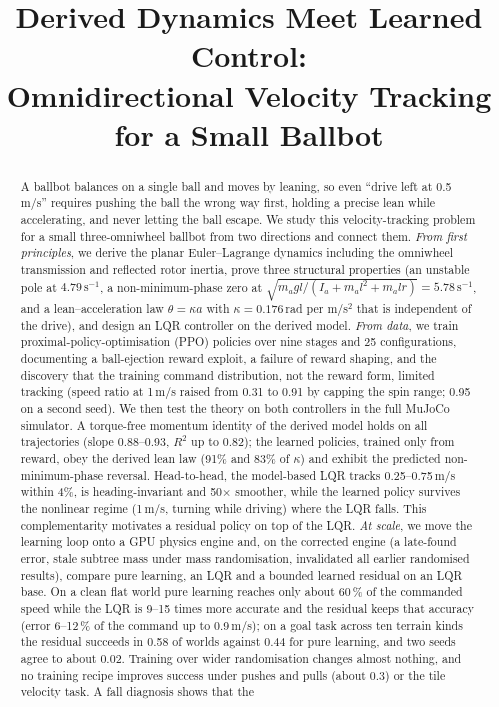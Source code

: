 \documentclass[conference]{IEEEtran}
\theoremstyle{remark}
\begin{document}
\title{Derived Dynamics Meet Learned Control:\\
Omnidirectional Velocity Tracking for a Small Ballbot}

\author{
}
\maketitle

\begin{abstract}
A ballbot balances on a single ball and moves by leaning, so even ``drive left at 0.5\,m/s'' requires pushing the ball the wrong way first, holding a precise lean while accelerating, and never letting the ball escape. We study this velocity-tracking problem for a small three-omniwheel ballbot from two directions and connect them. \emph{From first principles}, we derive the planar Euler--Lagrange dynamics including the omniwheel transmission and reflected rotor inertia, prove three structural properties (an unstable pole at $4.79\,\mathrm{s}^{-1}$, a non-minimum-phase zero at $\sqrt{m_a g l/(I_a+m_a l^2+m_a l r)}=5.78\,\mathrm{s}^{-1}$, and a lean--acceleration law $\theta=\kappa a$ with $\kappa=0.176$\,rad per m/s$^2$ that is independent of the drive), and design an LQR controller on the derived model. \emph{From data}, we train proximal-policy-optimisation (PPO) policies over nine stages and 25 configurations, documenting a ball-ejection reward exploit, a failure of reward shaping, and the discovery that the training command distribution, not the reward form, limited tracking (speed ratio at 1\,m/s raised from 0.31 to 0.91 by capping the spin range; 0.95 on a second seed). We then test the theory on both controllers in the full MuJoCo simulator. A torque-free momentum identity of the derived model holds on all trajectories (slope 0.88--0.93, $R^2$ up to 0.82); the learned policies, trained only from reward, obey the derived lean law (91\% and 83\% of $\kappa$) and exhibit the predicted non-minimum-phase reversal. Head-to-head, the model-based LQR tracks 0.25--0.75\,m/s within 4\%, is heading-invariant and 50$\times$ smoother, while the learned policy survives the nonlinear regime (1\,m/s, turning while driving) where the LQR falls. This complementarity motivates a residual policy on top of the LQR. \emph{At scale}, we move the learning loop onto a GPU physics engine and, on the corrected engine (a late-found error, stale subtree mass under mass randomisation, invalidated all earlier randomised results), compare pure learning, an LQR and a bounded learned residual on an LQR base. On a clean flat world pure learning reaches only about 60\,\% of the commanded speed while the LQR is 9--15 times more accurate and the residual keeps that accuracy (error 6--12\,\% of the command up to 0.9\,m/s); on a goal task across ten terrain kinds the residual succeeds in 0.58 of worlds against 0.44 for pure learning, and two seeds agree to about 0.02. Training over wider randomisation changes almost nothing, and no training recipe improves success under pushes and pulls (about 0.3) or the tile velocity task. A fall diagnosis shows that the 
\end{abstract}
\end{document}
